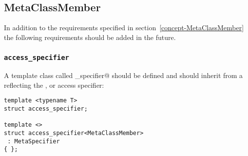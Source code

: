 \subsection{MetaClassMember}

In addition to the requirements specified in section~\ref{concept-MetaClassMember}
the following requirements should be added in the future.

\subsubsection{\texttt{access\_specifier}}

A template class called \verb@access_specifier@ should be defined and should inherit from
a  reflecting the \verb@private@, \verb@protected@ or \verb@public@
access specifier:

\begin{verbatim}
template <typename T>
struct access_specifier;

template <>
struct access_specifier<MetaClassMember>
 : MetaSpecifier
{ };
\end{verbatim}

